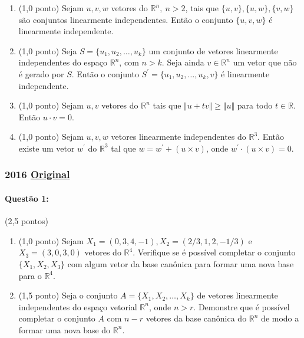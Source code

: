 \documentclass[12pt,a4paper]{article}
\newcommand{\original}[1]{\tiny \href{#1}{Original} \normalsize}
\begin{document}
\begin{enumerate}[label=(\alph*)]
\item (1,0 ponto) Sejam $u,v,w$ vetores do $\mathbb{R}^n, \ n > 2$, tais que $\{u,v\},\{u,w\},\{v,w\}$ são conjuntos linearmente independentes. Então o conjunto $\{u,v,w\}$ é linearmente independente.

\item (1,0 ponto) Seja $S=\{u_1,u_2,\dots,u_k\}$ um conjunto de vetores linearmente independentes do espaço $\mathbb{R}^n$, com $n>k$. Seja ainda $v \in \mathbb{R}^n$ um vetor que não é gerado por $S$. Então o conjunto $S^\prime = \{u_1,u_2,\dots,u_k,v\}$ é linearmente independente. 

\item (1,0 ponto) Sejam $u,v$ vetores do $\mathbb{R}^n$ tais que $\Vert u + tv \Vert \geq \Vert u \Vert$ para todo $t \in \mathbb{R}$. Então $u \cdot v=0$.

\item (1,0 ponto) Sejam $u,v,w$ vetores linearmente independentes do $\mathbb{R}^3$. Então existe um vetor $w^\prime$ do $\mathbb{R}^3$ tal que $w=w^\prime + (u\times v)$, onde $w^\prime \cdot (u \times v)=0$.
\end{enumerate}

\newpage
\subsubsection{2016 \original{https://drive.google.com/file/d/1hb_1RUzVND8VXIu_Akd0eUhl7D1AUVjK/view?usp=sharing}}

\paragraph{Questão 1:} (2,5 pontos) 

\begin{enumerate}[label=(\alph*)]
\item (1,0 ponto) Sejam $X_1=(0,3,4,-1), X_2=(2/3,1,2,-1/3)$ e $X_3=(3,0,3,0)$ vetores do $\mathbb{R}^4$. Verifique se é possível completar o conjunto $\{X_1,X_2,X_3 \}$ com algum vetor da base canônica para formar uma nova base para o $\mathbb{R}^4$. 
\item (1,5 ponto) Seja o conjunto $A=\{X_1,X_2,\dots,X_k\}$ de vetores linearmente independentes do espaço vetorial $\mathbb{R}^n$, onde $n>r$. Demonstre que é possível completar o conjunto $A$ com $n-r$ vetores da base canônica do $\mathbb{R}^n$ de modo a formar uma nova base do $\mathbb{R}^n$.
\end{enumerate}
\end{document}
